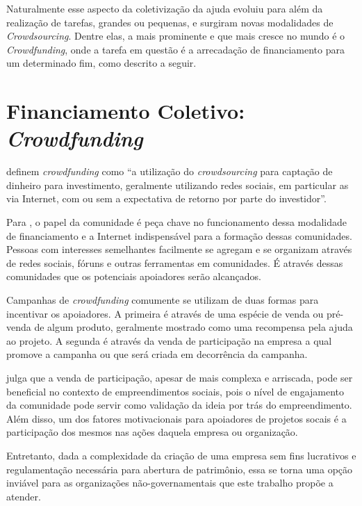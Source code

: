 Naturalmente esse aspecto da coletivização da ajuda evoluiu para além da realização de tarefas, grandes ou pequenas, e surgiram novas modalidades de \emph{Crowdsourcing}. Dentre elas, a mais prominente e que mais cresce no mundo é o \emph{Crowdfunding}, onde a tarefa em questão é a arrecadação de financiamento para um determinado fim, como descrito a seguir.



\section{Financiamento Coletivo: \emph{Crowdfunding}}
\citeauthor{belleflamme2010} definem \emph{crowdfunding} como ``a utilização do \emph{crowdsourcing} para captação de dinheiro para investimento, geralmente utilizando redes sociais, em particular as via Internet, com ou sem a expectativa de retorno por parte do investidor''.

Para \citeauthor{golan2015crowdfunding}, o papel da comunidade é peça chave no funcionamento dessa modalidade de financiamento e a Internet indispensável para a formação dessas comunidades. Pessoas com interesses semelhantes facilmente se agregam e se organizam através de redes sociais, fóruns e outras ferramentas em comunidades. É através dessas comunidades que os potenciais apoiadores serão alcançados.

Campanhas de \emph{crowdfunding} comumente se utilizam de duas formas para incentivar os apoiadores\cite{belleflamme2014crowdfunding}. A primeira é através de uma espécie de venda ou pré-venda de algum produto, geralmente mostrado como uma recompensa pela ajuda ao projeto. A segunda é através da venda de participação na empresa a qual promove a campanha ou que será criada em decorrência da campanha.

\citeauthor{lehner2013crowdfunding} julga que a venda de participação, apesar de mais complexa e arriscada, pode ser beneficial no contexto de empreendimentos sociais, pois o nível de engajamento da comunidade pode servir como validação da ideia por trás do empreendimento. Além disso, um dos fatores motivacionais para apoiadores de projetos socais é a participação dos mesmos nas ações daquela empresa ou organização.

Entretanto, dada a complexidade da criação de uma empresa sem fins lucrativos e regulamentação necessária para abertura de patrimônio, essa se torna uma opção inviável para as organizações não-governamentais que este trabalho propõe a atender.


